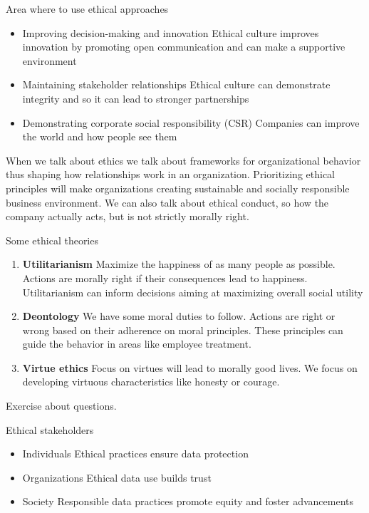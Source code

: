 Area where to use ethical approaches

\begin{itemize}
    \item Improving decision-making and innovation \ra Ethical culture improves innovation by promoting open communication and can make a supportive environment
    \item Maintaining stakeholder relationships \ra Ethical culture can demonstrate integrity and so it can lead to stronger partnerships
    \item Demonstrating corporate social responsibility (CSR) \ra Companies can improve the world and how people see them
\end{itemize}

When we talk about ethics we talk about frameworks for organizational behavior thus shaping how relationships work in an organization. Prioritizing ethical principles will make organizations creating sustainable and socially responsible business environment. We can also talk about ethical conduct, so how the company actually acts, but is not strictly morally right. 

\vspace{10pt}

Some ethical theories

\begin{enumerate}
    \item \textbf{Utilitarianism} \ra Maximize the happiness of as many people as possible. Actions are morally right if their consequences lead to happiness. Utilitarianism can inform decisions aiming at maximizing overall social utility
    \item \textbf{Deontology} \ra We have some moral duties to follow. Actions are right or wrong based on their adherence on moral principles. These principles can guide the behavior in areas like employee treatment. 
    \item \textbf{Virtue ethics} \ra Focus on virtues will lead to morally good lives. We focus on developing virtuous characteristics like honesty or courage.
\end{enumerate}

Exercise about questions. 

\vspace{10pt}

Ethical stakeholders
\begin{itemize}
    \item Individuals \ra Ethical practices ensure data protection
    \item Organizations \ra Ethical data use builds trust
    \item Society \ra Responsible data practices promote equity and foster advancements
\end{itemize}

